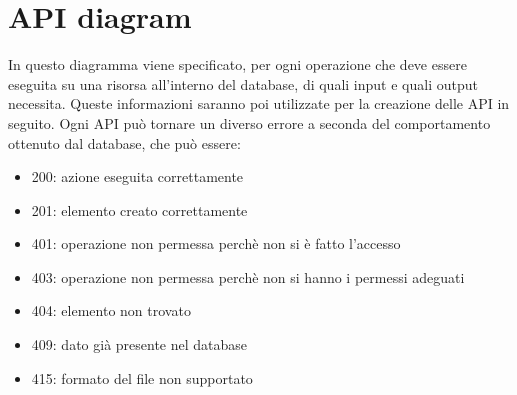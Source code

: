 \documentclass[a4paper,12pt]{article}
\begin{document}
\newpage
\section{API diagram}
In questo diagramma viene specificato, per ogni operazione che deve essere eseguita su una risorsa all'interno del database, di quali input e quali output necessita. \newline
Queste informazioni saranno poi utilizzate per la creazione delle API in seguito.\newline 
Ogni API può tornare un diverso errore a seconda del comportamento ottenuto dal database, che può essere:
\begin{itemize}
    \item 200: azione eseguita correttamente
    \item 201: elemento creato correttamente
    \item 401: operazione non permessa perchè non si è fatto l'accesso
    \item 403: operazione non permessa perchè non si hanno i permessi adeguati
    \item 404: elemento non trovato
    \item 409: dato già presente nel database
    \item 415: formato del file non supportato
\end{itemize}
\end{document}
